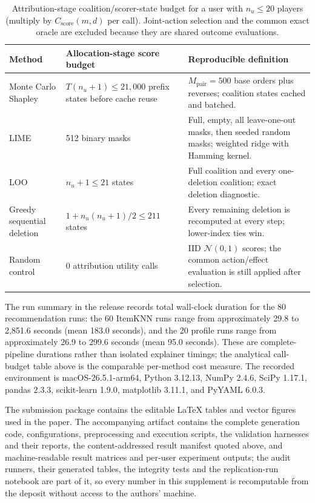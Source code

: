 \documentclass[manuscript,screen,anonymous]{acmart}
\begin{document}
\begin{table}[!htbp]
\centering\small
\caption{Attribution-stage coalition/scorer-state budget for a user with $n_u\le20$ players (multiply by $C_{\mathrm{score}}(m,d)$ per call). Joint-action selection and the common exact oracle are excluded because they are shared outcome evaluations.}
\label{tab:computational-cost}
\begin{tabular}{@{}p{}p{}p{}@{}}
\toprule
Method & Allocation-stage score budget & Reproducible definition \\
\midrule
Monte Carlo Shapley & $T(n_u+1)\le21{,}000$ prefix states before cache reuse & $M_{\mathrm{pair}}=500$ base orders plus reverses; coalition states cached and batched. \\
LIME & 512 binary masks & Full, empty, all leave-one-out masks, then seeded random masks; weighted ridge with Hamming kernel. \\
LOO & $n_u+1\le21$ states & Full coalition and every one-deletion coalition; exact deletion diagnostic. \\
Greedy sequential deletion & $1+n_u(n_u+1)/2\le211$ states & Every remaining deletion is recomputed at every step; lower-index ties win. \\
Random control & 0 attribution utility calls & IID $\mathcal{N}(0,1)$ scores; the common action/effect evaluation is still applied after selection. \\
\bottomrule
\end{tabular}
\end{table}

The run summary in the release records total wall-clock duration for the 80 recommendation runs: the 60 ItemKNN runs range from approximately 29.8 to 2,851.6 seconds (mean 183.0 seconds), and the 20 profile runs range from approximately 26.9 to 299.6 seconds (mean 95.0 seconds). These are complete-pipeline durations rather than isolated explainer timings; the analytical call-budget table above is the comparable per-method cost measure. The recorded environment is macOS-26.5.1-arm64, Python 3.12.13, NumPy 2.4.6, SciPy 1.17.1, pandas 2.3.3, scikit-learn 1.9.0, matplotlib 3.11.1, and PyYAML 6.0.3. 

The submission package contains the editable LaTeX tables and vector figures used in the paper. The accompanying artifact contains the complete generation code, configurations, preprocessing and execution scripts, the validation harnesses and their reports, the content-addressed result manifest quoted above, and machine-readable result matrices and per-user experiment outputs; the audit runners, their generated tables, the integrity tests and the replication-run notebook are part of it, so every number in this supplement is recomputable from the deposit without access to the authors' machine.
\end{document}
